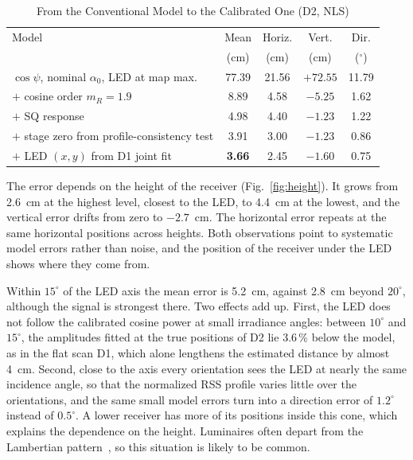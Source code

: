 \begin{table}[!t]
 \centering
 \caption{From the Conventional Model to the Calibrated One (D2, NLS)}
 \label{tab:ablation}
 \footnotesize
 \setlength{\tabcolsep}{2.5pt}
 \begin{tabular}{@{}lcccc@{}}
 \toprule
 Model & Mean & Horiz. & Vert. & Dir.\\
 & (cm) & (cm) & (cm) & ($^\circ$)\\
 \midrule
 $\cos\psi$, nominal $\alpha_0$, LED at map max. & 77.39 & 21.56 & $+72.55$ & 11.79\\
 $+$ cosine order $m_R=1.9$ & 8.89 & 4.58 & $-5.25$ & 1.62\\
 $+$ SQ response & 4.98 & 4.40 & $-1.23$ & 1.22\\
 $+$ stage zero from profile-consistency test & 3.91 & 3.00 & $-1.23$ & 0.86\\
 $+$ LED $(x,y)$ from D1 joint fit & \textbf{3.66} & 2.45 & $-1.60$ & 0.75\\
 \bottomrule
 \end{tabular}
\end{table}

The error depends on the height of the receiver (Fig.~\ref{fig:height}). It grows from 2.6~cm at the highest level, closest to the LED, to 4.4~cm at the lowest, and the vertical error drifts from zero to $-2.7$~cm. The horizontal error repeats at the same horizontal positions across heights. Both observations point to systematic model errors rather than noise, and the position of the receiver under the LED shows where they come from.

Within $15^\circ$ of the LED axis the mean error is 5.2~cm, against 2.8~cm beyond $20^\circ$, although the signal is strongest there. Two effects add up. First, the LED does not follow the calibrated cosine power at small irradiance angles: between $10^\circ$ and $15^\circ$, the amplitudes fitted at the true positions of D2 lie 3.6\,\% below the model, as in the flat scan D1, which alone lengthens the estimated distance by almost 4~cm. Second, close to the axis every orientation sees the LED at nearly the same incidence angle, so that the normalized RSS profile varies little over the orientations, and the same small model errors turn into a direction error of $1.2^\circ$ instead of $0.5^\circ$. A lower receiver has more of its positions inside this cone, which explains the dependence on the height. Luminaires often depart from the Lambertian pattern~\cite{Ding2016,Bastiaens2026}, so this situation is likely to be common.

